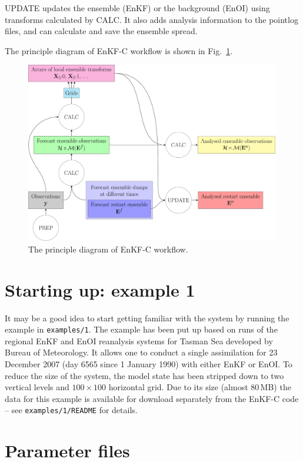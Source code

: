 \documentclass[11pt]{report}
\begin{document}
UPDATE updates the ensemble (EnKF) or the background (EnOI) using transforms calculated by CALC.
It also adds analysis information to the pointlog files, and can calculate and save the ensemble spread.

The principle diagram of EnKF-C workflow is shown in Fig.~\ref{fig:calcupdate}.
\begin{figure}
  \centering
  \includegraphics[width = 0.99\textwidth]{plots/enkfc.pdf}
  \caption{The principle diagram of EnKF-C workflow.}
  \label{fig:calcupdate}
\end{figure}

\section{Starting up: example 1}
\label{example1}

It may be a good idea to start getting familiar with the system by running the example in \verb|examples/1|.
The example has been put up based on runs of the regional EnKF and EnOI reanalysis systems for Tasman Sea developed by Bureau of Meteorology. 
It allows one to conduct a single assimilation for 23 December 2007 (day 6565 since 1 January 1990) with either EnKF or EnOI.
To reduce the size of the system, the model state has been stripped down to two vertical levels and $100 \times 100$ horizontal grid.
Due to its size (almost 80\,MB) the data for this example is available for download separately from the EnKF-C code -- see \verb|examples/1/README| for details.

\section{Parameter files}
\end{document}
